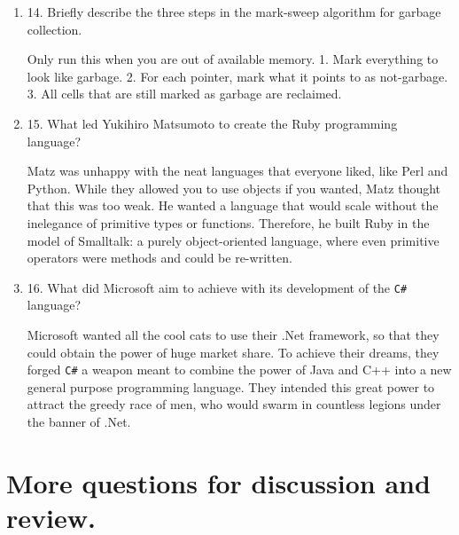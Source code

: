 \documentclass{article}
\begin{document}
\begin{enumerate}
\begin{answer}
    \end{answer}

  \item 14. Briefly describe the three steps in the mark-sweep algorithm
    for garbage collection.

  \begin{answer}

    Only run this when you are out of available memory.
    1. Mark everything to look like garbage.
    2. For each pointer, mark what it points to as not-garbage.
    3. All cells that are still marked as garbage are reclaimed. 

    \end{answer}

  \item 15. What led Yukihiro Matsumoto to create the Ruby programming language?

  \begin{answer}

    Matz was unhappy with the neat languages that everyone liked, like
    Perl and Python. While they allowed you to use objects if you
    wanted, Matz thought that this was too weak. He wanted a language
    that would scale without the inelegance of primitive types or
    functions. Therefore, he built Ruby in the model of Smalltalk: a
    purely object-oriented language, where even primitive operators
    were methods and could be re-written.

    \end{answer}

  \item 16. What did Microsoft aim to achieve with its development of the
    \verb+C#+ language?

  \begin{answer}

    Microsoft wanted all the cool cats to use their .Net framework, so
    that they could obtain the power of huge market share. To achieve
    their dreams, they forged \verb+C#+ a weapon meant to combine the
    power of Java and C++ into a new general purpose programming
    language. They intended this great power to attract the greedy
    race of men, who would swarm in countless legions under the banner
    of .Net.

    \end{answer}

  \end{enumerate}



\section{More questions for discussion and review.}
\end{document}
